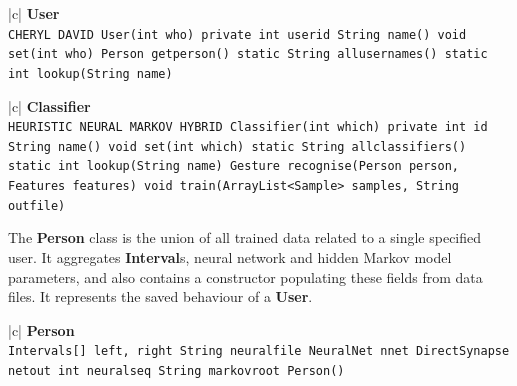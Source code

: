\documentclass[12pt,a4,notitlepage]{report}
\renewcommand{\_}{\texttt{\symbol{95}}}
\newcommand{\<}{\texttt{\symbol{60}}}
\renewcommand{\>}{\texttt{\symbol{62}}}
\newcommand{\class}[1]{\textbf{#1}}
\newcommand{\variable}[1]{\texttt{#1}}
\begin{document}
\begin{tabular}{|c|} \hline 
\class{User} \\ \hline
{}
{\variable{CHERYL \newline DAVID \newline
User(int who) \newline
private int userid \newline
String name() \newline
void set(int who) \newline
Person get\_person() \newline
static String all\_usernames() \newline
static int lookup(String name)
} } \\ \hline
\end{tabular}

\begin{tabular}{|c|} \hline 
\class{Classifier} \\ \hline
{}
{\variable{HEURISTIC \newline NEURAL \newline MARKOV \newline HYBRID \newline
Classifier(int which) \newline
private int id \newline
String name() \newline
void set(int which) \newline
static String all\_classifiers() \newline
static int lookup(String name) \newline
Gesture recognise(Person person, Features features) \newline
void train(ArrayList<Sample> samples, String out\_file)
} } \\ \hline
\end{tabular}

The \class{Person} class is the union of all trained data related to a single specified user. It aggregates \class{Interval}s, neural network and hidden Markov model parameters, and also contains a constructor populating these fields from data files. It represents the saved behaviour of a \class{User}.

\begin{tabular}{|c|} \hline 
\class{Person} \\ \hline
{}
{\variable{Intervals[] left, right \newline String neural\_file \newline NeuralNet nnet \newline DirectSynapse netout \newline int neural\_seq  \newline String markov\_root \newline Person()
} } \\ \hline
\end{tabular}
\end{document}
